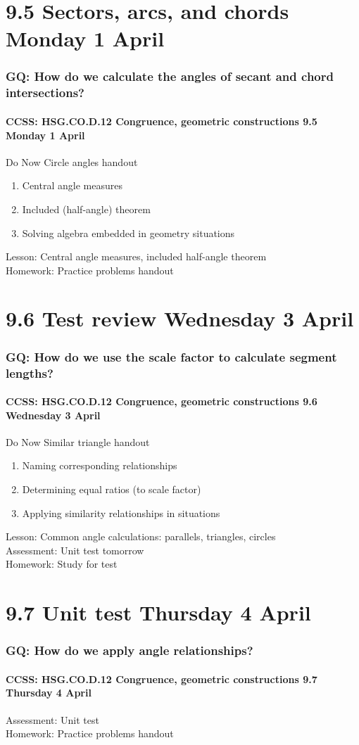 \documentclass{beamer}
\begin{document}
\section{9.5 Sectors, arcs, and chords Monday 1 April}
\frame
{
  \frametitle{GQ: How do we calculate the angles of secant and chord intersections?}
  \framesubtitle{CCSS: HSG.CO.D.12 Congruence, geometric constructions \hfill \alert{9.5 Monday 1 April}}

    \begin{block}{Do Now Circle angles handout}
      \begin{enumerate}
        \item Central angle measures
        \item Included (half-angle) theorem
        \item Solving algebra embedded in geometry situations
      \end{enumerate}
    \end{block}
  Lesson: Central angle measures, included half-angle theorem\\
  Homework: Practice problems handout
}

\section{9.6 Test review Wednesday 3 April}
  \frame
  {
    \frametitle{GQ: How do we use the scale factor to calculate segment lengths?}
    \framesubtitle{CCSS: HSG.CO.D.12 Congruence, geometric constructions \hfill \alert{9.6 Wednesday 3 April}}

    \begin{block}{Do Now Similar triangle handout}
      \begin{enumerate}
        \item Naming corresponding relationships
        \item Determining equal ratios (to scale factor)
        \item Applying similarity relationships in situations
      \end{enumerate}
    \end{block}
    Lesson: Common angle calculations: parallels, triangles, circles\\
    Assessment: \alert{Unit test tomorrow}\\[0.5cm]
    Homework: Study for test
  }

\section{9.7 Unit test Thursday 4 April}
  \frame
  {
    \frametitle{GQ: How do we apply angle relationships?}
    \framesubtitle{CCSS: HSG.CO.D.12 Congruence, geometric constructions \hfill \alert{9.7 Thursday 4 April}}

    Assessment: \alert{Unit test}\\[0.5cm]
    Homework: Practice problems handout
  }
\end{document}
